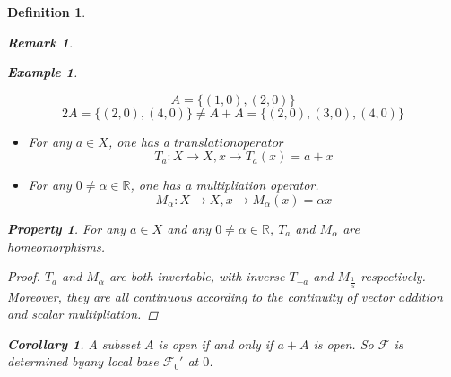 \documentclass{article}
\newtheorem*{property}{Property}
\newtheorem*{definition}{Definition}
\newtheorem*{remark}{Remark}
\newtheorem*{example}{Example}
\newtheorem*{corollary}{Corollary}
\begin{document}
\begin{definition}
\begin{remark}
\begin{example}
\begin{itemize}
                \[A = \{(1, 0), (2, 0)\} \]
                \[2A = \{(2, 0), (4, 0)\} \ne A + A = \{(2, 0), (3, 0), (4, 0)\}\]
            \end{itemize}
        \end{example}
        \begin{itemize}
            \item For any $a \in X$, one has a $translation operator$
            \[
                T_a: X \rightarrow X, x \rightarrow T_a(x) = a + x
            \]
            \item For any $0 \ne \alpha \in \mathbb{R}$, one has a multipliation operator.
            \[
                M_\alpha : X \rightarrow X, x \rightarrow M_\alpha(x) = \alpha x
            \]
        \end{itemize}
        \begin{property}
            For any $a \in X$ and any $0 \ne \alpha \in \mathbb{R}$, $T_a$ and $M_\alpha$ are homeomorphisms.
            \begin{proof}
                $T_a$ and $M_{\alpha}$ are both invertable, with inverse $T_{-a}$ and $M_{\frac{1}{\alpha}}$ respectively.
                Moreover, they are all continuous according to the continuity of vector addition and scalar multipliation.
            \end{proof}
        \end{property}
        \begin{corollary}
            A subsset $A$ is open if and only if $a + A$ is open. 
            So $\mathcal{F}$ is determined byany local base $\mathcal{F}_{0}'$ at $0$.
        \end{corollary}
    \end{remark}
\end{definition}
\end{document}
